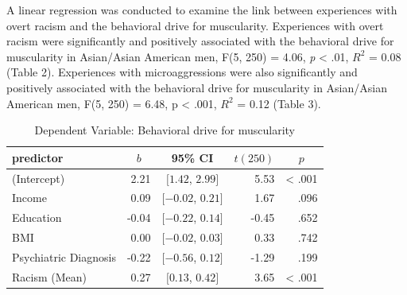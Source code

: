 \documentclass[
  english,
  man, fleqn, noextraspace,floatsintext]{apa6}
\begin{document}
A linear regression was conducted to examine the link between experiences with overt racism and the behavioral drive for muscularity. Experiences with overt racism were significantly and positively associated with the behavioral drive for muscularity in Asian/Asian American men, F(5, 250) = 4.06, \emph{p} \textless{} .01, \(R^2\) = 0.08 (Table 2). Experiences with microaggressions were also significantly and positively associated with the behavioral drive for muscularity in Asian/Asian American men, F(5, 250) = 6.48, p \textless{} .001, \(R^2\) = 0.12 (Table 3).

\begin{table}[tbp]

\begin{center}
\begin{threeparttable}

\caption{\label{tab:regression-table}Dependent Variable: Behavioral drive for muscularity}

\begin{tabular}{lrcrr}
\toprule
predictor & \multicolumn{1}{c}{$b$} & \multicolumn{1}{c}{95\% CI} & \multicolumn{1}{c}{$t(250)$} & \multicolumn{1}{c}{$p$}\\
\midrule
(Intercept) & 2.21 & $[1.42$, $2.99]$ & 5.53 & < .001\\
Income & 0.09 & $[-0.02$, $0.21]$ & 1.67 & .096\\
Education & -0.04 & $[-0.22$, $0.14]$ & -0.45 & .652\\
BMI & 0.00 & $[-0.02$, $0.03]$ & 0.33 & .742\\
Psychiatric Diagnosis & -0.22 & $[-0.56$, $0.12]$ & -1.29 & .199\\
Racism (Mean) & 0.27 & $[0.13$, $0.42]$ & 3.65 & < .001\\
\bottomrule
\end{tabular}

\end{threeparttable}
\end{center}

\end{table}
\end{document}
